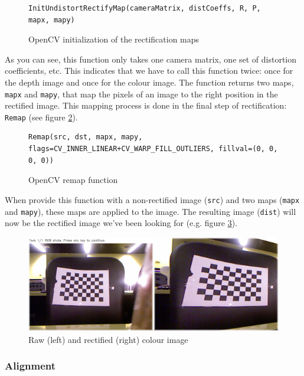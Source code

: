 \begin{figure}[H]
\begin{lstlisting}
InitUndistortRectifyMap(cameraMatrix, distCoeffs, R, P, mapx, mapy)
\end{lstlisting}
\caption{OpenCV initialization of the rectification maps}
\label{code:initrecmap}
\end{figure}

As you can see, this function only takes one camera matrix, one set of
distortion coefficients, etc. This indicates that we have to call this function
twice: once for the depth image and once for the colour image. The function
returns two maps, \verb|mapx| and \verb|mapy|, that map the pixels of an image
to the right position in the rectified image. This mapping process is done in
the final step of rectification: \verb|Remap| (see figure \ref{code:remap}).

\begin{figure}[H]
\begin{lstlisting}
Remap(src, dst, mapx, mapy, flags=CV_INNER_LINEAR+CV_WARP_FILL_OUTLIERS, fillval=(0, 0, 0, 0)) 
\end{lstlisting}
\caption{OpenCV remap function}
\label{code:remap}
\end{figure}

When provide this function with a non-rectified image (\verb|src|) and two maps
(\verb|mapx| and \verb|mapy|), these maps are applied to the image. The
resulting image (\verb|dist|) will now be the rectified image we've been looking
for (e.g. figure \ref{fig:rectify}).

\begin{figure}[H]
\centering
\includegraphics[scale=0.6]{images/rectify.png}
\caption{Raw (left) and rectified (right) colour image}
\label{fig:rectify}
\end{figure}


\subsubsection{Alignment}
\label{sec:alignment}

